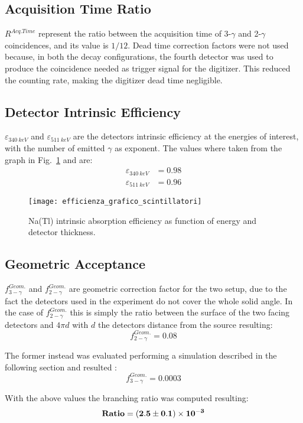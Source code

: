 \subsection*{Acquisition Time Ratio}
$R^{Acq.Time}$ represent the ratio between the acquisition time of 3-$\gamma$ and 2-$\gamma$ coincidences, and its value is $1/12$.
Dead time correction factors were not used because, in both the decay configurations, the fourth detector was used to produce the coincidence needed as trigger signal for the digitizer. This reduced the counting rate, making the digitizer dead time negligible.

\subsection*{Detector Intrinsic Efficiency}
$\varepsilon_{340~keV}$ and $\varepsilon_{511~keV}$ are the detectors intrinsic efficiency at the energies of interest,  with the number of emitted $\gamma$ as exponent. The values where taken from the graph in Fig.~\ref{Fig:Efficiency} and are: 
\begin{equation*}
\begin{split}
\varepsilon_{340~keV} & =0.98 \\
\varepsilon_{511~keV}  & =0.96
\end{split}
\end{equation*} 

\begin{figure}[H]
\centering
\texttt{[image: efficienza\_grafico\_scintillatori]}
\caption{Na(Tl) intrinsic absorption efficiency as function of energy and detector thickness.}
\label{Fig:Efficiency}
\end{figure} 

\subsection*{Geometric Acceptance}
$f_{3-\gamma}^{Geom.}$ and $f_{2-\gamma}^{Geom.}$ are geometric correction factor for the two setup, due to the fact the detectors used in the experiment do not cover the whole solid angle. In the case of $f_{2-\gamma}^{Geom.}$ this is simply the ratio between the surface of the two facing detectors and $4 \pi d$ with $d$ the detectors distance from the source resulting: 
\begin{equation*}
f_{2-\gamma}^{Geom.}=0.08
\end{equation*}

 The former instead was evaluated performing a simulation described in the following section and resulted :
\begin{equation*}
f_{3-\gamma}^{Geom.}=0.0003
\end{equation*}

With the above values the branching ratio was computed resulting:
\begin{equation*}
\mathbf{ \text{\textbf{Ratio}}=(2.5\pm0.1)\times 10^{-3} }
\end{equation*}




